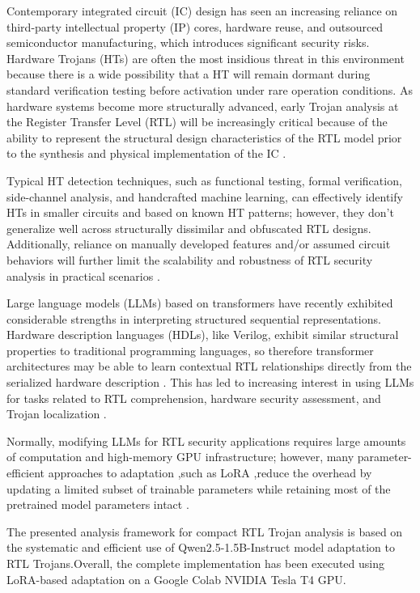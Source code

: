 \documentclass[conference]{IEEEtran}
\begin{document}
Contemporary integrated circuit (IC) design has seen an increasing reliance on third-party intellectual property (IP) cores, hardware reuse, and outsourced semiconductor manufacturing, which introduces significant security risks. Hardware Trojans (HTs) are often the most insidious threat in this environment because there is a wide possibility that a HT will remain dormant during standard verification testing before activation under rare operation conditions. As hardware systems become more structurally advanced, early Trojan analysis at the Register Transfer Level (RTL) will be increasingly critical because of the ability to represent the structural design characteristics of the RTL model prior to the synthesis and physical implementation of the IC \cite{tehranipoor2010survey,jin2008pathdelay}.

Typical HT detection techniques, such as functional testing, formal verification, side-channel analysis, and handcrafted machine learning, can effectively identify HTs in smaller circuits and based on known HT patterns; however, they don't generalize well across structurally dissimilar and obfuscated RTL designs. Additionally, reliance on manually developed features and/or assumed circuit behaviors will further limit the scalability and robustness of RTL security analysis in practical scenarios \cite{tehranipoor2010survey,jin2008pathdelay}.

Large language models (LLMs) based on transformers have recently exhibited considerable strengths in interpreting structured sequential representations. Hardware description languages (HDLs), like Verilog, exhibit similar structural properties to traditional programming languages, so therefore transformer architectures may be able to learn contextual RTL relationships directly from the serialized hardware description \cite{vaswani2017attention}. This has led to increasing interest in using LLMs for tasks related to RTL comprehension, hardware security assessment, and Trojan localization \cite{kundu2025pearl,trojanwhisper}.

Normally, modifying LLMs for RTL security applications requires large amounts of computation and high-memory GPU infrastructure; however, many parameter-efficient approaches to adaptation ,such as LoRA ,reduce the overhead by updating a limited subset of trainable parameters while retaining most of the pretrained model parameters intact \cite{lora}. 

The presented analysis framework for compact RTL Trojan analysis is based on the systematic and efficient use of Qwen2.5-1.5B-Instruct model adaptation to RTL Trojans.Overall, the complete implementation has been executed using LoRA-based adaptation on a Google Colab NVIDIA Tesla T4 GPU.
\end{document}
